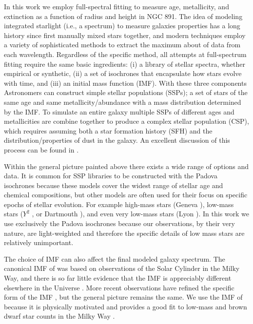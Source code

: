 In this work we employ full-spectral fitting to measure age,
metallicity, and extinction as a function of radius and height in NGC
891. The idea of modeling integrated starlight (i.e., a spectrum) to
measure galaxies properties has a long history since \citet{Spinrad71}
first manually mixed stars together, and modern techniques employ a
variety of sophisticated methods to extract the maximum about of data
from each wavelength. Regardless of the specific method, all attempts
at full-spectrum fitting require the same basic ingredients: (i) a
library of stellar spectra, whether empirical or synthetic, (ii) a set
of isochrones that encapsulate how stars evolve with time, and (iii)
an initial mass function (IMF). With these three components
Astronomers can construct simple stellar populations (SSPs); a set of
stars of the same age and same metallicity/abundance with a mass
distribution determined by the IMF. To simulate an entire galaxy
multiple SSPs of different ages and metallicities are combine together
to produce a complex stellar population (CSP), which requires assuming
both a star formation history (SFH) and the distribution/properties of
dust in the galaxy. An excellent discussion of this process can be
found in \citet[and his diagram shown in Figure
  \ref{intro:fig:conroy}]{Conroy13}.

Within the general picture painted above there exists a wide range of
options and data. It is common for SSP libraries to be constructed
with the Padova isochrones \citep{Bertelli94, Girardi00, Marigo08}
because these models cover the widest range of stellar age and
chemical compositions, but other models are often used for their focus
on specific epochs of stellar evolution. For example high-mass stars
(Geneva \citep{Schaller92,Meynet00}), low-mass stars ($Y^2$
\citep{Yi01,Yi03}, or Dartmouth \citep{Dotter08}), and even very
low-mass stars (Lyon \citep{Chabrier97,Baraffe98}). In this work we
use exclusively the Padova isochrones because our observations, by
their very nature, are light-weighted and therefore the specific
details of low mass stars are relatively unimportant.

The choice of IMF can also affect the final modeled galaxy
spectrum. The canonical IMF of \citet{Salpeter55} was based on
observations of the Solar Cylinder in the Milky Way, and there is so
far little evidence that the IMF is appreciably different elsewhere in
the Universe \citep{Bastian10}. More recent observations have refined
the specific form of the IMF \citep{Kroupa01, Chabrier03}, but the
general picture remains the same. We use the IMF of \citet{Chabrier03}
because it is physically motivated and provides a good fit to low-mass
and brown dwarf star counts in the Milky Way
\citep{Bruzual03,Chabrier01,Chabrier03}.

